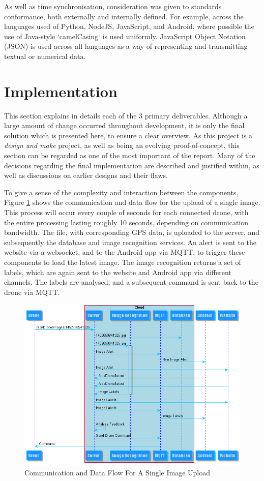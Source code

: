 \documentclass{article}
\begin{document}
As well as time synchronisation, consideration was given to standards conformance, both externally and internally defined. For example, across the languages used of Python, NodeJS, JavaScript, and Android, where possible the use of Java-style `camelCasing` is used uniformly. JavaScript Object Notation (JSON) is used across all languages as a way of representing and transmitting textual or numerical data.

\section{Implementation}
This section explains in details each of the 3 primary deliverables. Although a large amount of change occurred throughout development, it is only the final solution which is presented here, to ensure a clear overview. As this project is a \textit{design and make} project, as well as being an evolving proof-of-concept, this section can be regarded as one of the most important of the report. Many of the decisions regarding the final implementation are described and justified within, as well as discussions on earlier designs and their flaws. 

To give a sense of the complexity and interaction between the components, Figure \ref{fig:CommSingleUpload} shows the communication and data flow for the upload of a single image. This process will occur every couple of seconds for each connected drone, with the entire processing lasting roughly 10 seconds, depending on communication bandwidth. The file, with corresponding GPS data, is uploaded to the server, and subsequently the database and image recognition services. An alert is sent to the website via a websocket, and to the Android app via MQTT, to trigger these components to load the latest image. The image recognition returns a set of labels, which are again sent to the website and Android app via different channels. The labels are analysed, and a subsequent command is sent back to the drone via MQTT.

\begin{figure}[h]
\centering
\caption{Communication and Data Flow For A Single Image Upload\label{fig:CommSingleUpload}}
\includegraphics[width=\textwidth]{CommSingleUpload}
\end{figure}
 
\end{document}
